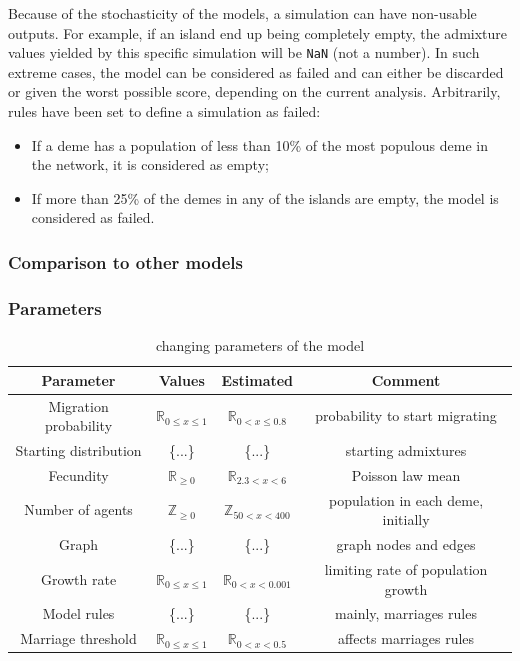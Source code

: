 \documentclass[a4paper,12pt]{report}
\begin{document}
Because of the stochasticity of the models, a simulation can have non-usable outputs. For example, if an island end up being completely empty, the admixture values yielded by this specific simulation will be \texttt{NaN} (not a number). In such extreme cases, the model can be considered as failed and can either be discarded or given the worst possible score, depending on the current analysis. Arbitrarily, rules have been set to define a simulation as failed:
\begin{itemize}
	\item If a deme has a population of less than 10\% of the most populous deme in the network, it is considered as empty;
	\item If more than 25\% of the demes in any of the islands are empty, the model is considered as failed.
\end{itemize}

\subsubsection{Comparison to other models}
\subsubsection{Parameters}

\begin{table}
	\centering
	\begin{tabular}{|c|c|c|c|}
		\hline
 		Parameter & Values & Estimated & Comment \\ \hline
        Migration probability & $\mathbb{R}_{0 \leq x \leq 1}$ & $\mathbb{R}_{0 < x \leq 0.8}$ & probability to start migrating \\ \hline
        Starting distribution & \{...\} & \{...\} & starting admixtures \\ \hline
        Fecundity & $\mathbb{R}_{\geq 0}$ & $\mathbb{R}_{2.3 < x < 6}$ & Poisson law mean \\ \hline
        Number of agents & $\mathbb{Z}_{\geq 0}$ & $\mathbb{Z}_{50 < x < 400}$ & population in each deme, initially \\ \hline
        Graph & \{...\} & \{...\} & graph nodes and edges \\ \hline
        Growth rate & $\mathbb{R}_{0 \leq x \leq 1}$ & $\mathbb{R}_{0 < x < 0.001}$ & limiting rate of population growth \\ \hline
        Model rules & \{...\} & \{...\} & mainly, marriages rules \\ \hline
        Marriage threshold & $\mathbb{R}_{0 \leq x \leq 1}$ & $\mathbb{R}_{0 < x < 0.5}$ & affects marriages rules \\ \hline
	\end{tabular}
	\caption{changing parameters of the model}
	\label{parameters}
\end{table}
\end{document}
